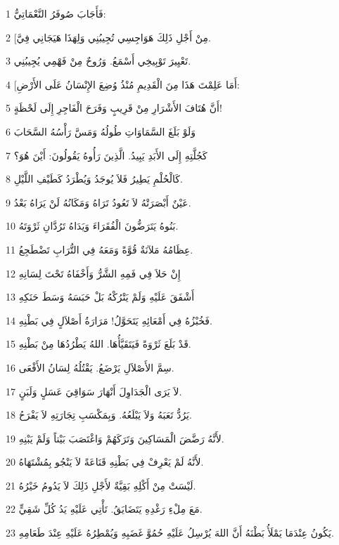 \par 1 فَأَجَابَ صُوفَرُ النَّعْمَاتِيُّ:
\par 2 [مِنْ أَجْلِ ذَلِكَ هَوَاجِسِي تُجِيبُنِي وَلِهَذَا هَيَجَانِي فِيَّ.
\par 3 تَعْيِيرَ تَوْبِيخِي أَسْمَعُ. وَرُوحٌ مِنْ فَهْمِي يُجِيبُنِي.
\par 4 [أَمَا عَلِمْتَ هَذَا مِنَ الْقَدِيمِ مُنْذُ وُضِعَ الإِنْسَانُ عَلَى الأَرْضِ:
\par 5 أَنَّ هُتَافَ الأَشْرَارِ مِنْ قَرِيبٍ وَفَرَحَ الْفَاجِرِ إِلَى لَحْظَةٍ!
\par 6 وَلَوْ بَلَغَ السَّمَاوَاتِ طُولُهُ وَمَسَّ رَأْسُهُ السَّحَابَ
\par 7 كَجُلَّتِهِ إِلَى الأَبَدِ يَبِيدُ. الَّذِينَ رَأُوهُ يَقُولُونَ: أَيْنَ هُوَ؟
\par 8 كَالْحُلْمِ يَطِيرُ فَلاَ يُوجَدُ وَيُطْرَدُ كَطَيْفِ اللَّيْلِ.
\par 9 عَيْنٌ أَبْصَرَتْهُ لاَ تَعُودُ تَرَاهُ وَمَكَانُهُ لَنْ يَرَاهُ بَعْدُ.
\par 10 بَنُوهُ يَتَرَضُّونَ الْفُقَرَاءَ وَيَدَاهُ تَرُدَّانِ ثَرْوَتَهُ.
\par 11 عِظَامُهُ مَلآنَةٌ قُوَّةً وَمَعَهُ فِي التُّرَابِ تَضْطَجِعُ.
\par 12 إِنْ حَلاَ فِي فَمِهِ الشَّرُّ وَأَخْفَاهُ تَحْتَ لِسَانِهِ
\par 13 أَشْفَقَ عَلَيْهِ وَلَمْ يَتْرُكْهُ بَلْ حَبَسَهُ وَسَطَ حَنَكِهِ
\par 14 فَخُبْزُهُ فِي أَمْعَائِهِ يَتَحَوَّلُ! مَرَارَةُ أَصْلاَلٍ فِي بَطْنِهِ.
\par 15 قَدْ بَلَعَ ثَرْوَةً فَيَتَقَيَّأُهَا. اللهُ يَطْرُدُهَا مِنْ بَطْنِهِ.
\par 16 سِمَّ الأَصْلاَلِ يَرْضَعُ. يَقْتُلُهُ لِسَانُ الأَفْعَى.
\par 17 لاَ يَرَى الْجَدَاوِلَ أَنْهَارَ سَوَاقِيَ عَسَلٍ وَلَبَنٍ.
\par 18 يَرُدُّ تَعَبَهُ وَلاَ يَبْلَعُهُ. وَبِمَكْسَبِ تِجَارَتِهِ لاَ يَفْرَحُ.
\par 19 لأَنَّهُ رَضَّضَ الْمَسَاكِينَ وَتَرَكَهُمْ وَاغْتَصَبَ بَيْتاً وَلَمْ يَبْنِهِ.
\par 20 لأَنَّهُ لَمْ يَعْرِفْ فِي بَطْنِهِ قَنَاعَةً لاَ يَنْجُو بِمُشْتَهَاهُ.
\par 21 لَيْسَتْ مِنْ أَكْلِهِ بَقِيَّةٌ لأَجْلِ ذَلِكَ لاَ يَدُومُ خَيْرُهُ.
\par 22 مَعَ مِلْءِ رَغْدِهِ يَتَضَايَقُ. تَأْتِي عَلَيْهِ يَدُ كُلِّ شَقِيٍّ.
\par 23 يَكُونُ عِنْدَمَا يَمْلَأُ بَطْنَهُ أَنَّ اللهَ يُرْسِلُ عَلَيْهِ حُمُوَّ غَضَبِهِ وَيُمْطِرُهُ عَلَيْهِ عِنْدَ طَعَامِهِ.
